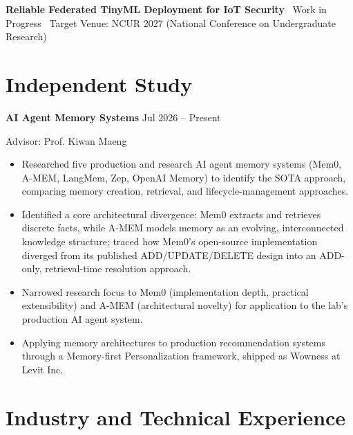 \documentclass[11pt,a4paper]{article}
\begin{document}
\vspace{0.4em}

\textbf{Reliable Federated TinyML Deployment for IoT Security} \
Work in Progress \
Target Venue: NCUR 2027 (National Conference on Undergraduate Research)






\section*{Independent Study}

\textbf{AI Agent Memory Systems} \hfill Jul 2026 -- Present

Advisor: Prof. Kiwan Maeng

\begin{itemize}[leftmargin=1.5em]

\item Researched five production and research AI agent memory systems (Mem0, A-MEM, LangMem, Zep, OpenAI Memory) to identify the SOTA approach, comparing memory creation, retrieval, and lifecycle-management approaches.

\item Identified a core architectural divergence: Mem0 extracts and retrieves discrete facts, while A-MEM models memory as an evolving, interconnected knowledge structure; traced how Mem0's open-source implementation diverged from its published ADD/UPDATE/DELETE design into an ADD-only, retrieval-time resolution approach.

\item Narrowed research focus to Mem0 (implementation depth, practical extensibility) and A-MEM (architectural novelty) for application to the lab's production AI agent system.

\item Applying memory architectures to production recommendation systems through a Memory-first Personalization framework, shipped as Wowness at Levit Inc.

\end{itemize}


\section*{Industry and Technical Experience}
\end{document}
